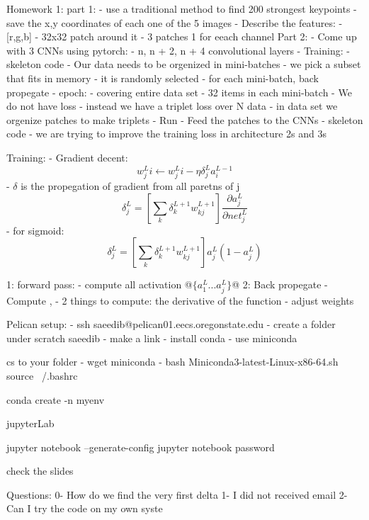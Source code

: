 Homework 1:
part 1:
- use a traditional method to find 200 strongest keypoints
- save the x,y coordinates of each one of the 5 images
- Describe the features:
 - [r,g,b]
 - 32x32 patch around it
 - 3 patches 1 for eeach channel
Part 2:
- Come up with 3 CNNs using pytorch:
 - n, n + 2, n + 4 convolutional layers
 - Training:
  - skeleton code
  - Our data needs to be orgenized in mini-batches
   - we pick a subset that fits in memory
   - it is randomly selected
   - for each mini-batch, back propegate
   - epoch:
    - covering entire data set
   - 32 items in each mini-batch
  - We do not have loss
   - instead we have a triplet loss over N data
   - in data set we orgenize patches to make triplets
 - Run
  - Feed the patches to the CNNs
  - skeleton code
- we are trying to improve the training loss in architecture 2s and 3s

Training:
- Gradient decent:
\[w^L_ji \leftarrow w^L_ji - \eta \delta^L_j a^{L-1}_i\]
- $\delta$ is the propegation of gradient from all paretns of j
\[\delta^L_j = [\sum_k \delta^{L+1}_kw^{L+1}_{kj}]\frac{\partial a^L_j}{\partial net^L_j}\]
- for sigmoid:
\[\delta^L_j = [\sum_k \delta^{L+1}_kw^{L+1}_{kj}] a^L_j (1-a^L_j)\]
\begin{ps}
1: forward pass:
 - compute all activation @$\{a^L_1 ... a^L_j\}$@
2: Back propegate
 - Compute \delta, 
  - 2 things to compute: the derivative of the function
 - adjust weights
\end{ps}

Pelican setup:
- ssh saeedib@pelican01.eecs.oregonstate.edu
- create a folder under scratch saeedib
- make a link
- install conda
- use miniconda

cs to your folder
- wget miniconda
- bash Miniconda3-latest-Linux-x86-64.sh
source ~/.bashrc

conda create -n myenv

jupyterLab

jupyter notebook --generate-config
jupyter notebook password

check the slides

Questions:
0- How do we find the very first delta
1- I did not received email
2- Can I try the code on my own syste

